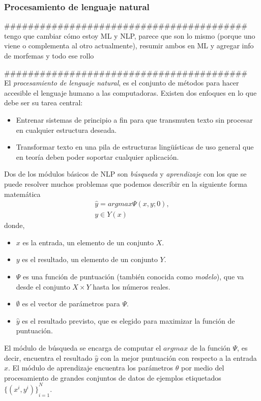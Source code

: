 \subsubsection {Procesamiento de lenguaje natural}\label{subsec:nlp}
\#\#\#\#\#\#\#\#\#\#\#\#\#\#\#\#\#\#\#\#\#\#\#\#\#\#\#\#\#\#\#\#\#\#\#\#\#\#\#\#\#\\
tengo que cambiar cómo estoy ML y NLP, parece que son lo mismo (porque uno viene o complementa al otro actualmente), resumir ambos en ML y agregar info de morfemas y todo ese rollo

\#\#\#\#\#\#\#\#\#\#\#\#\#\#\#\#\#\#\#\#\#\#\#\#\#\#\#\#\#\#\#\#\#\#\#\#\#\#\#\#\#\\
El \emph{procesamiento de lenguaje natural}, es el conjunto de métodos para hacer accesible el lenguaje humano a las computadoras\cite{eise19}. Existen dos enfoques en lo que debe ser su tarea central: 
\begin{itemize}
	\item Entrenar sistemas de principio a fin para que transmuten texto sin procesar en cualquier estructura deseada.
	\item Transformar texto en una pila de estructuras lingüísticas de uso general que en teoría deben poder soportar cualquier aplicación.
\end{itemize}
Dos de los módulos básicos de NLP son \emph{búsqueda} y \emph{aprendizaje} con los que se puede resolver muchos problemas que podemos describir en la siguiente forma matemática
\begin{equation}
\begin{matrix}
\hat{y}=argmax\Psi(x,y;0),\\
y\in Y(x)
\end{matrix}
\end{equation}
donde,
\begin{itemize}
	\item $x$ es la entrada, un elemento de un conjunto $X$.
	\item $y$ es el resultado, un elemento de un conjunto $Y$.
	\item $\Psi$ es una función de puntuación (también conocida como \emph{modelo}), que va desde el conjunto $X\times Y$ hasta los números reales.
	\item $\emptyset$ es el vector de parámetros para $\Psi$.
	\item $\hat{y}$ es el resultado previsto, que es elegido para maximizar la función de puntuación.
\end{itemize}
El módulo de búsqueda se encarga de computar el $argmax$ de la función $\Psi$, es decir, encuentra el resultado $\hat{y}$ con la mejor puntuación con respecto a la entrada $x$. El módulo de aprendizaje encuentra los parámetros $\theta$ por medio del procesamiento de grandes conjuntos de datos de ejemplos etiquetados ${\{(x^i,y^i)\}}_{i=1}^{N}$.